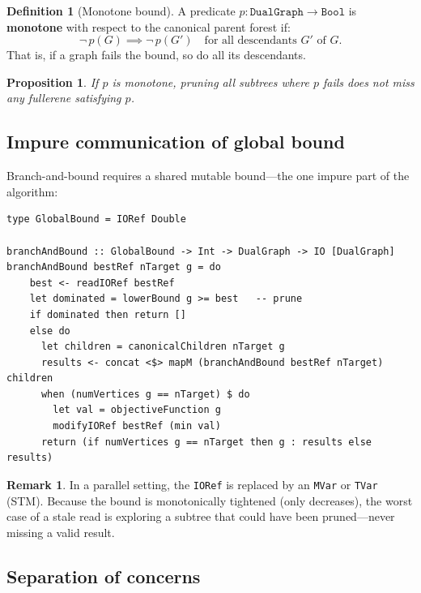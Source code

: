 \documentclass[11pt,a4paper]{article}
\newtheorem{proposition}[theorem]{Proposition}
\theoremstyle{definition}
\newtheorem{definition}[theorem]{Definition}
\newtheorem{remark}[theorem]{Remark}
\begin{document}
\begin{definition}[Monotone bound]
A predicate $p : \texttt{DualGraph} \to \texttt{Bool}$ is
\textbf{monotone} with respect to the canonical parent forest if:
\[
  \neg\, p(G) \implies \neg\, p(G') \quad
  \text{for all descendants } G' \text{ of } G.
\]
That is, if a graph fails the bound, so do all its descendants.
\end{definition}

\begin{proposition}
If $p$ is monotone, pruning all subtrees where $p$ fails does not
miss any fullerene satisfying $p$.
\end{proposition}

\subsection{Impure communication of global bound}

Branch-and-bound requires a shared mutable bound---the one impure part
of the algorithm:

\begin{lstlisting}
type GlobalBound = IORef Double

branchAndBound :: GlobalBound -> Int -> DualGraph -> IO [DualGraph]
branchAndBound bestRef nTarget g = do
    best <- readIORef bestRef
    let dominated = lowerBound g >= best   -- prune
    if dominated then return []
    else do
      let children = canonicalChildren nTarget g
      results <- concat <$> mapM (branchAndBound bestRef nTarget) children
      when (numVertices g == nTarget) $ do
        let val = objectiveFunction g
        modifyIORef bestRef (min val)
      return (if numVertices g == nTarget then g : results else results)
\end{lstlisting}

\begin{remark}
In a parallel setting, the \texttt{IORef} is replaced by an
\texttt{MVar} or \texttt{TVar} (STM).  Because the bound is
monotonically tightened (only decreases), the worst case of a stale
read is exploring a subtree that could have been pruned---never
missing a valid result.
\end{remark}

\subsection{Separation of concerns}
\end{document}
